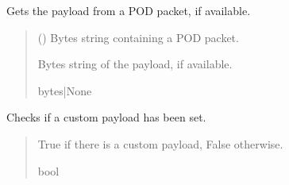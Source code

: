 \documentclass[letterpaper,10pt,english]{sphinxmanual}
\begin{document}
\begin{fulllineitems}
\begin{fulllineitems}
\end{fulllineitems}


\begin{fulllineitems}
\label{\detokenize{Morelia.Packets:Morelia.Packets.Standard.PacketStandard.GetPayload}}
\pysigstartsignatures
{}
\pysigstopsignatures
\sphinxAtStartPar
Gets the payload from a POD packet, if available.
\begin{quote}\begin{description}
\sphinxAtStartPar
{} () \textendash{} Bytes string containing a POD packet.

\sphinxAtStartPar
Bytes string of the payload, if available.

\sphinxAtStartPar
bytes|None

\end{description}\end{quote}

\end{fulllineitems}


\begin{fulllineitems}
\label{\detokenize{Morelia.Packets:Morelia.Packets.Standard.PacketStandard.HasCustomPayload}}
\pysigstartsignatures
{}
\pysigstopsignatures
\sphinxAtStartPar
Checks if a custom payload has been set.
\begin{quote}\begin{description}
\sphinxAtStartPar
True if there is a custom payload, False otherwise.

\sphinxAtStartPar
bool


\end{description}
\end{quote}
\end{fulllineitems}
\end{fulllineitems}
\end{document}
